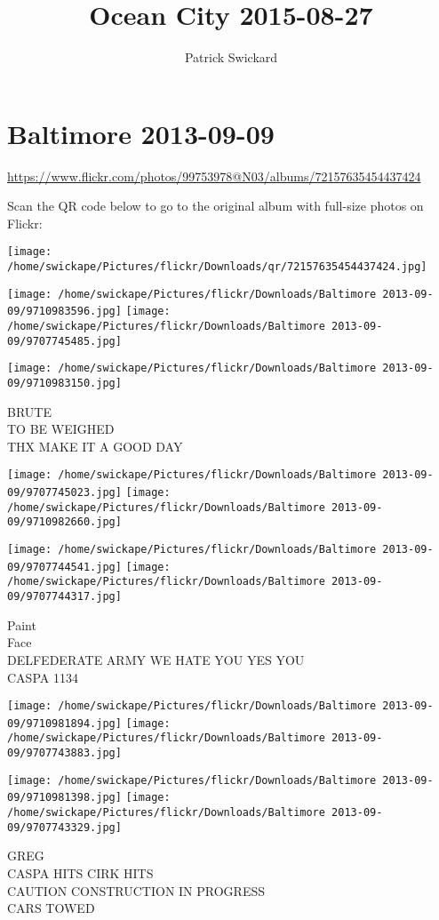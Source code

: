 \documentclass[10pt,letterpaper]{article}
\title{Ocean City 2015-08-27}
\author{Patrick Swickard}
\date{}
\begin{document}
\section*{Baltimore 2013-09-09}

\url{https://www.flickr.com/photos/99753978@N03/albums/72157635454437424}

Scan the QR code below to go to the original album with full-size photos on Flickr:

\texttt{[image: /home/swickape/Pictures/flickr/Downloads/qr/72157635454437424.jpg]}
\pagebreak

\texttt{[image: /home/swickape/Pictures/flickr/Downloads/Baltimore 2013-09-09/9710983596.jpg]}
\texttt{[image: /home/swickape/Pictures/flickr/Downloads/Baltimore 2013-09-09/9707745485.jpg]}

\vspace{0.25in}
\texttt{[image: /home/swickape/Pictures/flickr/Downloads/Baltimore 2013-09-09/9710983150.jpg]}

BRUTE\\
TO BE WEIGHED\\
THX MAKE IT A GOOD DAY
\pagebreak

\texttt{[image: /home/swickape/Pictures/flickr/Downloads/Baltimore 2013-09-09/9707745023.jpg]}
\texttt{[image: /home/swickape/Pictures/flickr/Downloads/Baltimore 2013-09-09/9710982660.jpg]}

\texttt{[image: /home/swickape/Pictures/flickr/Downloads/Baltimore 2013-09-09/9707744541.jpg]}
\texttt{[image: /home/swickape/Pictures/flickr/Downloads/Baltimore 2013-09-09/9707744317.jpg]}

Paint\\
Face\\
DELFEDERATE ARMY WE HATE YOU YES YOU\\
CASPA 1134
\pagebreak

\texttt{[image: /home/swickape/Pictures/flickr/Downloads/Baltimore 2013-09-09/9710981894.jpg]}
\texttt{[image: /home/swickape/Pictures/flickr/Downloads/Baltimore 2013-09-09/9707743883.jpg]}

\texttt{[image: /home/swickape/Pictures/flickr/Downloads/Baltimore 2013-09-09/9710981398.jpg]}
\texttt{[image: /home/swickape/Pictures/flickr/Downloads/Baltimore 2013-09-09/9707743329.jpg]}

GREG\\
CASPA HITS CIRK HITS\\
CAUTION CONSTRUCTION IN PROGRESS\\
CARS TOWED
\pagebreak
\end{document}
